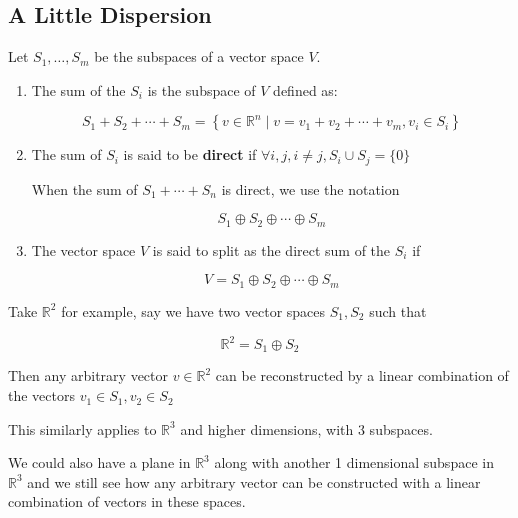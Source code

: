 \subsection{A Little Dispersion} 

\begin{definition}
	Let $S_1, \ldots, S_m$ be the subspaces of a vector space $V$.

	\begin{enumerate}
		\item The sum of the $S_i$ is the subspace of $V$ defined as:
		
		\[S_1 + S_2 + \cdots + S_m = \left\{v \in \mathbb{R}^n \mid v = v_1 + v_2 + \cdots + v_m, v_i \in S_i\right\}\]

		\item The sum of $S_i$ is said to be \textbf{direct} if $\forall i, j, i\neq j, S_i \cup S_j = \{0\}$

		When the sum of $S_1 + \cdots + S_n$ is direct, we use the notation

		\[S_1 \oplus S_2 \oplus \cdots \oplus S_m\]

		\item The vector space $V$ is said to split as the direct sum of the $S_i$ if
		
		\[V = S_1 \oplus S_2 \oplus\cdots\oplus S_m\]
	\end{enumerate}
\end{definition}

\begin{example}
	Take $\mathbb{R}^2$ for example, say we have two vector spaces $S_1, S_2$ such that

	\[\mathbb{R}^2 = S_1 \oplus S_2\]

	Then any arbitrary vector $v \in \mathbb{R}^2$ can be reconstructed by a linear combination of the vectors $v_1 \in S_1, v_2 \in S_2$

	This similarly applies to $\mathbb{R}^3$ and higher dimensions, with 3 subspaces.

	We could also have a plane in $\mathbb{R}^3$ along with another 1 dimensional subspace in $\mathbb{R}^3$ and we still see how any arbitrary vector can be constructed with a linear combination of vectors in these spaces.
\end{example}

